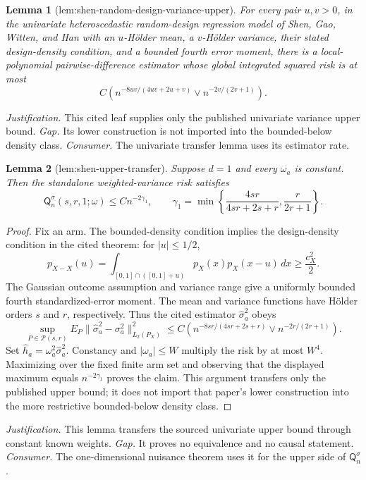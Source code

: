\documentclass{article}
\newtheorem{lemma}{Lemma}
\begin{document}
\begin{lemma}[lem:shen-random-design-variance-upper]\label{lem:shen-random-design-variance-upper}
For every pair \(u,v>0\), in the univariate heteroscedastic random-design regression model of Shen, Gao, Witten, and Han with an \(u\)-Hölder mean, a \(v\)-Hölder variance, their stated design-density condition, and a bounded fourth error moment, there is a local-polynomial pairwise-difference estimator whose global integrated squared risk is at most
\[
C\left(n^{-8uv/(4uv+2u+v)}\vee n^{-2v/(2v+1)}\right).
\]
\end{lemma}
\par\smallskip\noindent \textit{Justification.} This cited leaf supplies only the published univariate variance upper bound. \textit{Gap.} Its lower construction is not imported into the bounded-below density class. \textit{Consumer.} The univariate transfer lemma uses its estimator rate.

\begin{lemma}[lem:shen-upper-transfer]\label{lem:shen-upper-transfer}
Suppose \(d=1\) and every \(\omega_a\) is constant.  Then the standalone weighted-variance risk satisfies
\[
\mathsf Q_n^{\sigma}(s,r,1;\omega)\leq Cn^{-2\gamma_1},
\qquad
\gamma_1=\min\left\{\frac{4sr}{4sr+2s+r},\frac{r}{2r+1}\right\}.
\]
\end{lemma}
\begin{proof}
Fix an arm.  The bounded-density condition implies the design-density condition in the cited theorem: for \(|u|\leq1/2\),
\[
p_{X-X}(u)=\int_{[0,1]\cap([0,1]+u)}p_X(x)p_X(x-u)\,dx
\geq\frac{c_X^2}{2}.
\]
The Gaussian outcome assumption and variance range give a uniformly bounded fourth standardized-error moment.  The mean and variance functions have Hölder orders \(s\) and \(r\), respectively.  Thus the cited estimator \(\widehat\sigma_a^2\) obeys
\[
\sup_{P\in\mathcal P(s,r)}E_P\|\widehat\sigma_a^2-\sigma_a^2\|_{L_2(P_X)}^2
\leq C\left(n^{-8sr/(4sr+2s+r)}\vee n^{-2r/(2r+1)}\right).
\]
Set \(\widehat h_a=\omega_a^2\widehat\sigma_a^2\).  Constancy and \(|\omega_a|\leq W\) multiply the risk by at most \(W^4\).  Maximizing over the fixed finite arm set and observing that the displayed maximum equals \(n^{-2\gamma_1}\) proves the claim.  This argument transfers only the published upper bound; it does not import that paper's lower construction into the more restrictive bounded-below density class.
\end{proof}
\par\smallskip\noindent \textit{Justification.} This lemma transfers the sourced univariate upper bound through constant known weights. \textit{Gap.} It proves no equivalence and no causal statement. \textit{Consumer.} The one-dimensional nuisance theorem uses it for the upper side of \(\mathsf Q_n^{\sigma}\).
\end{document}
